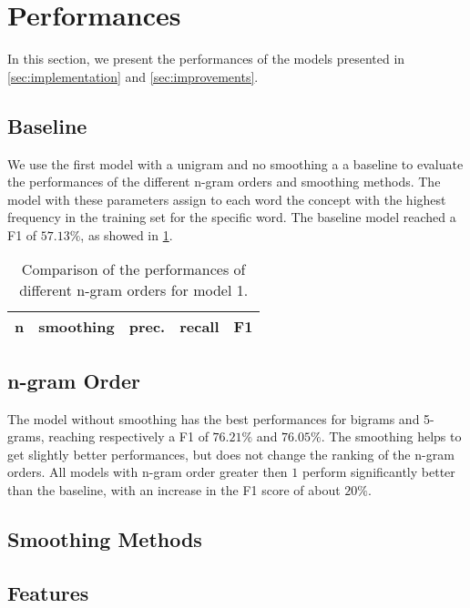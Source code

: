 \section{Performances}
\label{sec:performances}

In this section, we present the performances of the models presented in \cref{sec:implementation} and \ref{sec:improvements}.

\subsection{Baseline}
We use the first model with a unigram and no smoothing a a baseline to evaluate the performances of the different n-gram orders and smoothing methods.
The model with these parameters assign to each word the concept with the highest frequency in the training set for the specific word.
The baseline model reached a F1 of $57.13\%$, as showed in \cref{tab:v1-ngrams}. 

\begin{table}
	\centering
    \begin{tabular}{ l l l l l }
    	\toprule
    		n & smoothing & prec. & recall & F1 \\
    	\midrule
            
    	\bottomrule
	\end{tabular}
    \caption{Comparison of the performances of different n-gram orders for model 1.}
	\label{tab:v1-ngrams}
\end{table}

\subsection{n-gram Order}
The model without smoothing has the best performances for bigrams and 5-grams, reaching respectively a F1 of $76.21\%$  and $76.05\%$.
The smoothing helps to get slightly better performances, but does not change the ranking of the n-gram orders.
All models with n-gram order greater then $1$ perform significantly better than the baseline, with an increase in the F1 score of about $20\%$.

\subsection{Smoothing Methods}

\subsection{Features}
